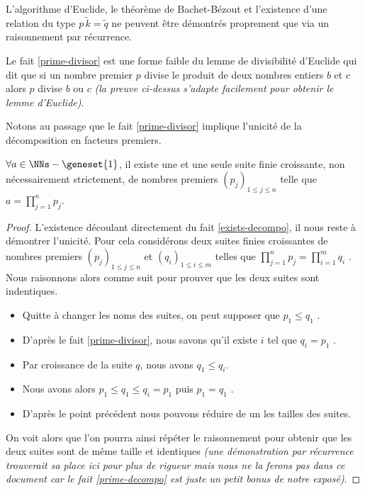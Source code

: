 \begin{unproved}
	L'algorithme d'Euclide, le théorème de Bachet-Bézout et l'existence d'une relation du type $p \, \widetilde{k} = \widetilde{q}$ ne peuvent être démontrés proprement que via un raisonnement par récurrence.

\end{unproved}


\begin{remark}
	Le fait \ref{prime-divisor} est une forme faible du lemme de divisibilité d'Euclide qui dit que si un nombre premier $p$ divise le produit de deux nombres entiers $b$ et $c$ alors $p$ divise $b$ ou $c$ \emph{(la preuve ci-dessus s'adapte facilement pour obtenir le lemme d'Euclide)}.  
\end{remark}


Notons au passage que le fait \ref{prime-divisor} implique l'unicité de la décomposition en facteurs premiers.

\begin{fact} \label{prime-decompo}
	$\forall a \in \NNs - \geneset{1}$, il existe une et une seule suite finie croissante, non nécessairement strictement, de nombres premiers $(p_j)_{1 \leq j \leq n}$
	telle que $\displaystyle a = \prod_{j=1}^{n} p_j$. 
\end{fact}
	

\begin{proof}
	L'existence découlant directement du fait \ref{exists-decompo}, il nous reste à démontrer l'unicité.
	Pour cela considérons deux suites finies croissantes de nombres premiers
	$(p_j)_{1 \leq j \leq n}$
	et
	$(q_i)_{1 \leq i \leq m}$
	telles que $\displaystyle \prod_{j=1}^{n} p_j = \prod_{i=1}^{m} q_i$ .
	Nous raisonnons alors comme suit pour prouver que les deux suites sont indentiques.
	
	\begin{itemize}[label=\small\textbullet]
		\item Quitte à changer les noms des suites, on peut supposer que $p_1 \leq q_1$ .
		

		\item D'après le fait \ref{prime-divisor}, nous savons qu'il existe $i$ tel que $q_i = p_1$ .
	
		\item Par croissance de la suite $q$, nous avons $q_1 \leq q_i$.
		
		\item Nous avons alors $p_1 \leq q_1 \leq q_i = p_1$ puis $p_1 = q_1$ .
		
		\item D'après le point précédent nous pouvons réduire de un les tailles des suites.
	\end{itemize}
	
	On voit alors que l'on pourra ainsi répéter le raisonnement pour obtenir que les deux suites sont de même taille et identiques \emph{(une démonstration par récurrence trouverait sa place ici pour plus de rigueur mais nous ne la ferons pas dans ce document car le fait \ref{prime-decompo} est juste un petit bonus de notre exposé)}.
\end{proof}
